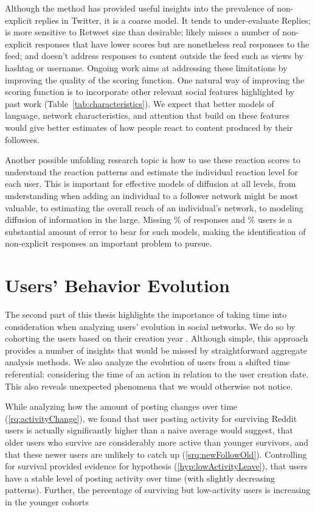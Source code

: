 Although the method has provided useful insights into the prevalence of non-explicit replies in Twitter, it is a coarse model.  It tends to under-evaluate Replies; is more sensitive to Retweet size than desirable; likely misses a number of non-explicit responses that have lower scores but are nonetheless real responses to the feed; and doesn't address responses to content outside the feed such as views by hashtag or username.  Ongoing work aims at addressing these limitations by improving the quality of the scoring function.  One natural way of improving the scoring function is to incorporate other relevant social features highlighted by past work (Table~\ref{tab:characteristics}).  We expect that better models of language, network characteristics, and attention that build on these features would give better estimates of how people react to content produced by their followees.

Another possible unfolding research topic is how to use these reaction scores to understand the reaction patterns and estimate the individual reaction level for each user.  This is important for effective models of diffusion at all levels, from understanding when adding an individual to a follower network might be most valuable, to estimating the overall reach of an individual's network, to modeling diffusion of information in the large.  Missing \highNonTaggedTweetCountPct{}\% of responses and \usersAboveLinePct{}\% users is a substantial amount of error to bear for such models, making the identification of non-explicit responses an important problem to pursue.


\section{Users' Behavior Evolution}

The second part of this thesis highlights the importance of taking time into consideration when analyzing users' evolution in social networks. We do so by cohorting the users based on their creation year \cite{Barbosa2016}. Although simple, this approach provides a number of insights that would be missed by straightforward aggregate analysis methods.  We also analyze the evolution of users from a shifted time referential: considering the time of an action in relation to the user creation date. This also reveals unexpected phenomena that we would otherwise not notice.

While analyzing how the amount of posting changes over time (\ref{rq:activityChange}), we found that user posting activity for surviving Reddit users is actually significantly higher than a naive average would suggest, that older users who survive are considerably more active than younger survivors, and that these newer users are unlikely to catch up (\ref{srq:newFollowOld}).  Controlling for survival provided evidence for hypothesis (\ref{hyp:lowActivityLeave}), that users have a stable level of posting activity over time (with slightly decreasing patterns).  Further, the percentage of surviving but low-activity users is increasing in the younger cohorts 

